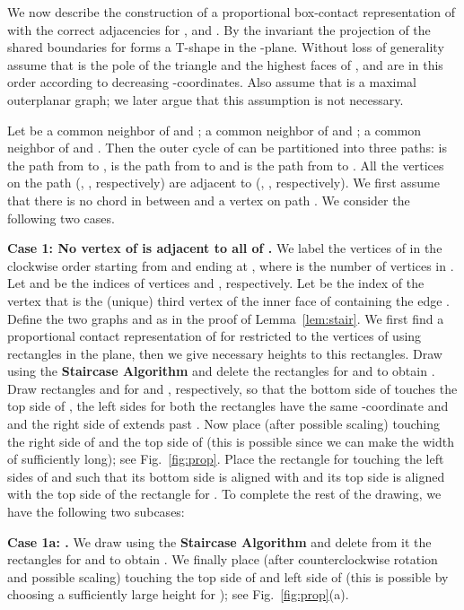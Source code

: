 \documentclass{llncs}
\begin{document}
	
	We now describe the construction of a proportional box-contact representation of 
	with the correct adjacencies for ,  and .
	By the invariant the projection of the shared boundaries for  forms a T-shape
	in the -plane. 
Without loss of generality assume that  is the pole of the triangle and the highest faces
	of ,  and  are in this order according to decreasing -coordinates.
Also assume that  is a maximal outerplanar graph; we later argue
	that this assumption is not necessary.
	
Let  be a common neighbor of  and ;  a common neighbor of  and ;
	 a common neighbor of  and . Then the outer cycle of  can be partitioned
	into three paths:  is the path from  to ,  is the path from  to
	 and  is the path from  to . All the vertices on the path
	 (, , respectively) are adjacent to  (, , respectively). We
	first assume that there is no chord in  between  and a vertex on path .
	We consider the following two cases.
	
	


	
	\smallskip\noindent
	\textbf{Case 1: No vertex of  is adjacent to all of .} We label the vertices
	of  in the clockwise order starting from  and ending at , where  is the
	number of vertices in . Let  and  be the indices of vertices  and ,
	respectively. Let  be the index of the vertex that is the (unique) third vertex of
	the inner face of  containing the edge . Define the two graphs  and
	 as in the proof of Lemma~\ref{lem:stair}. We first find a proportional contact
	representation of  for  restricted to the vertices of 
	using rectangles in the plane, then we give necessary heights to this rectangles.
	Draw  using the \textbf{Staircase Algorithm} and delete the rectangles for  and
	 to obtain . Draw rectangles  and  for  and ,
	respectively, so that the bottom side of  touches the top side of , the left
	sides for both the rectangles have the same -coordinate and and the right side of
	 extends past . Now place  (after possible scaling) touching the
	right side of  and the top side of  (this is possible since we can make the
	width of  sufficiently long); see Fig.~\ref{fig:prop}. Place the rectangle 
	for  touching the left sides of  and  such that its bottom side is aligned
	with  and its top side is aligned with the top side of the rectangle for .
	To complete the rest of the drawing, we have the following two subcases:
	
	\textbf{Case 1a: .} We draw  using the \textbf{Staircase Algorithm} and
	delete from it the rectangles for  and  to obtain . We finally place
	 (after  counterclockwise rotation and possible scaling) touching
	the top side of  and left side of  (this is possible by choosing a sufficiently
	large height for ); see Fig.~\ref{fig:prop}(a).
	
\end{document}
